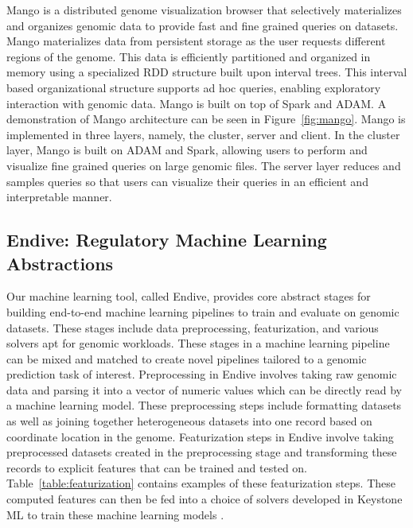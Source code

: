 \documentclass{sig-alternate-05-2015}
\begin{document}
Mango is a distributed genome visualization browser that selectively materializes and organizes genomic data to provide fast and fine grained queries on datasets. Mango materializes data from persistent storage as the user requests different regions of the genome. This data is efficiently partitioned and organized in memory using a specialized RDD structure built upon interval trees. This interval based organizational structure supports ad hoc queries, enabling exploratory interaction with genomic data.  Mango is built on top of Spark and ADAM. A demonstration of Mango architecture can be seen in Figure~\ref{fig:mango}. Mango is implemented in three layers, namely, the cluster, server and client. In the cluster layer, Mango is built on ADAM and Spark, allowing users to perform and visualize fine grained queries on large genomic files. The server layer reduces and samples queries so that users can visualize their queries in an efficient and interpretable manner.


\subsection{Endive: Regulatory Machine Learning Abstractions}
Our machine learning tool, called Endive, provides core abstract stages for building end-to-end machine learning pipelines to train and evaluate on genomic datasets. These stages include data preprocessing, featurization, and various solvers apt for genomic workloads. These stages in a machine learning pipeline can be mixed and matched to create novel pipelines tailored to a genomic prediction task of interest.
Preprocessing in Endive involves taking raw genomic data and parsing it into a vector of numeric values which can be directly read by a machine learning model. These preprocessing steps include formatting datasets as well as joining together heterogeneous datasets into one record based on coordinate location in the genome.
Featurization steps in Endive involve taking preprocessed datasets created in the preprocessing stage and transforming these records to explicit features that can be trained and tested on. Table~\ref{table:featurization} contains examples of these featurization steps. These computed features can then be fed into a choice of solvers developed in Keystone ML to train these machine learning models \cite{keystone}.
\end{document}
